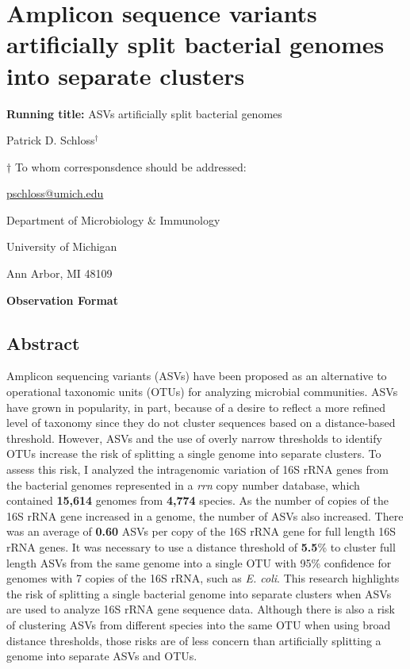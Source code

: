 \documentclass[
]{article}
\author{}
\date{\vspace{-2.5em}}
\begin{document}
\hypertarget{amplicon-sequence-variants-artificially-split-bacterial-genomes-into-separate-clusters}{%
\section{Amplicon sequence variants artificially split bacterial genomes
into separate
clusters}\label{amplicon-sequence-variants-artificially-split-bacterial-genomes-into-separate-clusters}}

\vspace{20mm}

\textbf{Running title:} ASVs artificially split bacterial genomes

\vspace{20mm}

Patrick D. Schloss\({^\dagger}\)

\vspace{40mm}

\({\dagger}\) To whom corresponsdence should be addressed:

\href{mailto:pschloss@umich.edu}{pschloss@umich.edu}

Department of Microbiology \& Immunology

University of Michigan

Ann Arbor, MI 48109

\vspace{20mm}

\textbf{Observation Format}

\newpage

\hypertarget{abstract}{%
\subsection{Abstract}\label{abstract}}

Amplicon sequencing variants (ASVs) have been proposed as an alternative
to operational taxonomic units (OTUs) for analyzing microbial
communities. ASVs have grown in popularity, in part, because of a desire
to reflect a more refined level of taxonomy since they do not cluster
sequences based on a distance-based threshold. However, ASVs and the use
of overly narrow thresholds to identify OTUs increase the risk of
splitting a single genome into separate clusters. To assess this risk, I
analyzed the intragenomic variation of 16S rRNA genes from the bacterial
genomes represented in a \emph{rrn} copy number database, which
contained \textbf{15,614} genomes from \textbf{4,774} species. As the
number of copies of the 16S rRNA gene increased in a genome, the number
of ASVs also increased. There was an average of \textbf{0.60} ASVs per
copy of the 16S rRNA gene for full length 16S rRNA genes. It was
necessary to use a distance threshold of \textbf{5.5}\% to cluster full
length ASVs from the same genome into a single OTU with 95\% confidence
for genomes with 7 copies of the 16S rRNA, such as \emph{E. coli}. This
research highlights the risk of splitting a single bacterial genome into
separate clusters when ASVs are used to analyze 16S rRNA gene sequence
data. Although there is also a risk of clustering ASVs from different
species into the same OTU when using broad distance thresholds, those
risks are of less concern than artificially splitting a genome into
separate ASVs and OTUs.
\end{document}
